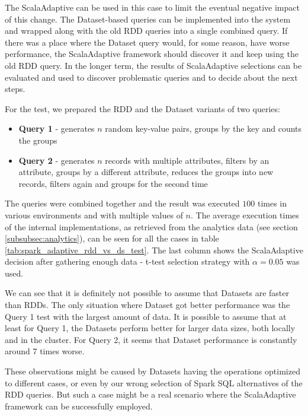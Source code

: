 The ScalaAdaptive can be used in this case to limit the eventual negative impact of this change. The Dataset-based queries can be implemented into the system and wrapped along with the old RDD queries into a single combined query. If there was a place where the Dataset query would, for some reason, have worse performance, the ScalaAdaptive framework should discover it and keep using the old RDD query. In the longer term, the results of ScalaAdaptive selections can be evaluated and used to discover problematic queries and to decide about the next steps.

For the test, we prepared the RDD and the Dataset variants of two queries:
\begin{itemize}
	\item \textbf{Query 1} - generates $n$ random key-value pairs, groups by the key and counts the groups
	\item \textbf{Query 2} - generates $n$ records with multiple attributes, filters by an attribute, groups by a different attribute, reduces the groups into new records, filters again and groups for the second time
\end{itemize}

The queries were combined together and the result was executed $100$ times in various environments and with multiple values of $n$. The average execution times of the internal implementations, as retrieved from the analytics data (see section \ref{subsubsec:analytics}), can be seen for all the cases in table \ref{tab:spark_adaptive_rdd_vs_ds_test}. The last column shows the ScalaAdaptive decision after gathering enough data - t-test selection strategy with $\alpha = 0.05$ was used.

We can see that it is definitely not possible to assume that Datasets are faster than RDDs. The only situation where Dataset got better performance was the Query 1 test with the largest amount of data. It is possible to assume that at least for Query 1, the Datasets perform better for larger data sizes, both locally and in the cluster. For Query 2, it seems that Dataset performance is constantly around 7 times worse.

These observations might be caused by Datasets having the operations optimized to different cases, or even by our wrong selection of Spark SQL alternatives of the RDD queries. But such a case might be a real scenario where the ScalaAdaptive framework can be successfully employed.

